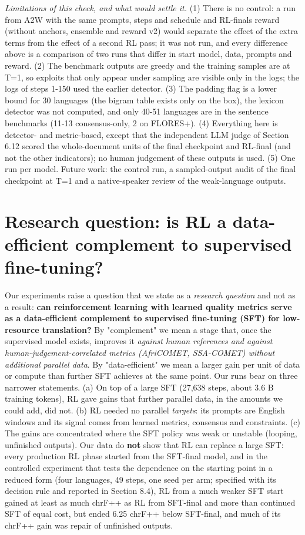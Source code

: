 \emph{Limitations of this check, and what would settle it.} (1) There is no control: a run from A2W with the same prompts, steps and schedule and RL-final\textquotesingle s reward (without anchors, ensemble and reward v2) would separate the effect of the extra terms from the effect of a second RL pass; it was not run, and every difference above is a comparison of two runs that differ in start model, data, prompts and reward. (2) The benchmark outputs are greedy and the training samples are at T=1, so exploits that only appear under sampling are visible only in the logs; the logs of steps 1-150 used the earlier detector. (3) The padding flag is a lower bound for 30 languages (the bigram table exists only on the box), the lexicon detector was not computed, and only 40-51 languages are in the sentence benchmarks (11-13 consensus-only, 2 on FLORES+). (4) Everything here is detector- and metric-based, except that the independent LLM judge of Section 6.12 scored the whole-document units of the final checkpoint and RL-final (and not the other indicators); no human judgement of these outputs is used. (5) One run per model. Future work: the control run, a sampled-output audit of the final checkpoint at T=1 and a native-speaker review of the weak-language outputs.

\section{Research question: is RL a data-efficient complement to supervised fine-tuning?}\label{research-question-is-rl-a-data-efficient-complement-to-supervised-fine-tuning}

Our experiments raise a question that we state as a \emph{research question} and not as a result: \textbf{can reinforcement learning with learned quality metrics serve as a data-efficient complement to supervised fine-tuning (SFT) for low-resource translation?} By "complement" we mean a stage that, once the supervised model exists, improves it \emph{against human references and against human-judgement-correlated metrics (AfriCOMET, SSA-COMET) without additional parallel data}. By "data-efficient" we mean a larger gain per unit of data or compute than further SFT achieves at the same point. Our runs bear on three narrower statements. (a) On top of a large SFT (27,638 steps, about 3.6 B training tokens), RL gave gains that further parallel data, in the amounts we could add, did not. (b) RL needed no parallel \emph{targets}: its prompts are English windows and its signal comes from learned metrics, consensus and constraints. (c) The gains are concentrated where the SFT policy was weak or unstable (looping, unfinished outputs). Our data do \textbf{not} show that RL can replace a large SFT: every production RL phase started from the SFT-final model, and in the controlled experiment that tests the dependence on the starting point in a reduced form (four languages, 49 steps, one seed per arm; specified with its decision rule and reported in Section 8.4), RL from a much weaker SFT start gained at least as much chrF++ as RL from SFT-final and more than continued SFT of equal cost, but ended 6.25 chrF++ below SFT-final, and much of its chrF++ gain was repair of unfinished outputs.

